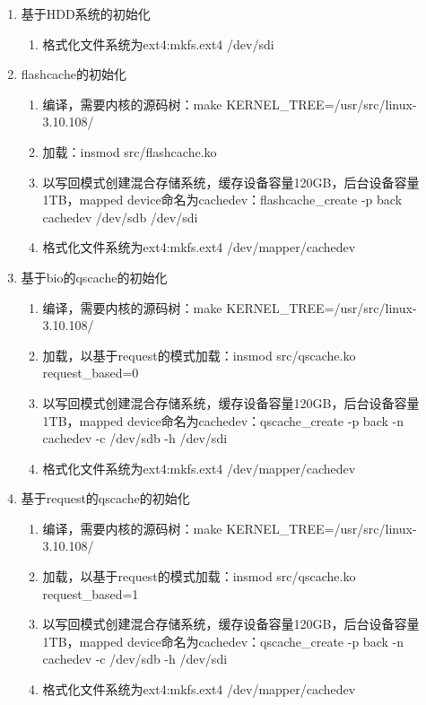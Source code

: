 \begin{enumerate}
    \item 基于HDD系统的初始化
          \begin{enumerate}
              \item 格式化文件系统为ext4:mkfs.ext4 /dev/sdi
          \end{enumerate}
    \item flashcache的初始化
    \begin{enumerate}
        \item 编译，需要内核的源码树：make KERNEL\_TREE=/usr/src/linux-3.10.108/
        \item 加载：insmod src/flashcache.ko
        \item 以写回模式创建混合存储系统，缓存设备容量120GB，后台设备容量1TB，mapped device命名为cachedev：flashcache\_create -p back cachedev /dev/sdb /dev/sdi
        \item 格式化文件系统为ext4:mkfs.ext4 /dev/mapper/cachedev
    \end{enumerate}
    \item 基于bio的qscache的初始化
    \begin{enumerate}
        \item 编译，需要内核的源码树：make KERNEL\_TREE=/usr/src/linux-3.10.108/
        \item 加载，以基于request的模式加载：insmod src/qscache.ko request\_based=0
        \item 以写回模式创建混合存储系统，缓存设备容量120GB，后台设备容量1TB，mapped device命名为cachedev：qscache\_create -p back -n cachedev -c /dev/sdb -h /dev/sdi
        \item 格式化文件系统为ext4:mkfs.ext4 /dev/mapper/cachedev
    \end{enumerate}
    \item 基于request的qscache的初始化
    \begin{enumerate}
        \item 编译，需要内核的源码树：make KERNEL\_TREE=/usr/src/linux-3.10.108/
        \item 加载，以基于request的模式加载：insmod src/qscache.ko request\_based=1
        \item 以写回模式创建混合存储系统，缓存设备容量120GB，后台设备容量1TB，mapped device命名为cachedev：qscache\_create -p back -n cachedev -c /dev/sdb -h /dev/sdi
        \item 格式化文件系统为ext4:mkfs.ext4 /dev/mapper/cachedev
    \end{enumerate}
\end{enumerate}

